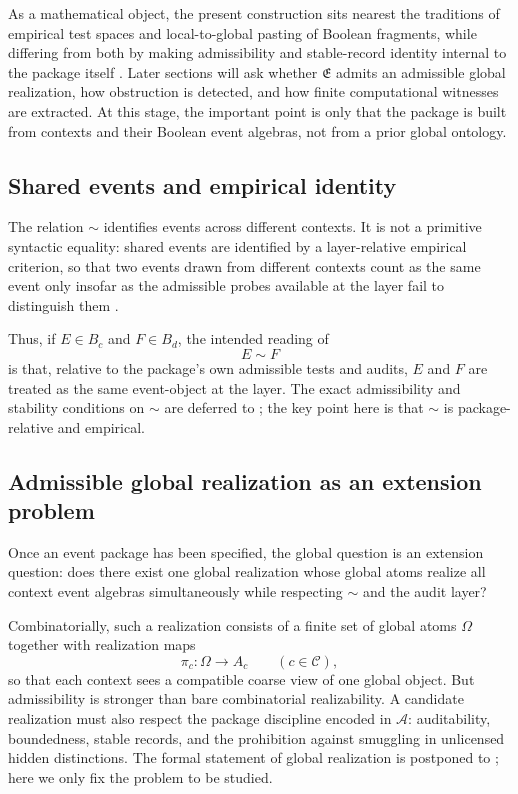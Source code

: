 \documentclass[11pt]{article}
\newcommand{\EventPackage}{\mathfrak{E}}
\theoremstyle{definition}
\begin{document}
As a mathematical object, the present construction sits nearest the traditions of empirical test spaces and local-to-global pasting of Boolean fragments, while differing from both by making admissibility and stable-record identity internal to the package itself \citep{FoulisRandall1972Operational,NavaraRogalewicz1991Pasting}. Later sections will ask whether \(\EventPackage\) admits an admissible global realization, how obstruction is detected, and how finite computational witnesses are extracted. At this stage, the important point is only that the package is built from contexts and their Boolean event algebras, not from a prior global ontology.

\subsection{Shared events and empirical identity}

The relation \(\sim\) identifies events across different contexts. It is not a primitive syntactic equality: shared events are identified by a layer-relative empirical criterion, so that two events drawn from different contexts count as the same event only insofar as the admissible probes available at the layer fail to distinguish them \citep{Tsiokos2026Quantum,Spekkens2005Contextuality,SchmidEtAl2021Noncontextuality}.

Thus, if \(E \in B_c\) and \(F \in B_d\), the intended reading of
\[
E \sim F
\]
is that, relative to the package's own admissible tests and audits, \(E\) and \(F\) are treated as the same event-object at the layer. The exact admissibility and stability conditions on \(\sim\) are deferred to ; the key point here is that \(\sim\) is package-relative and empirical.

\subsection{Admissible global realization as an extension problem}

Once an event package has been specified, the global question is an extension question: does there exist one global realization whose global atoms realize all context event algebras simultaneously while respecting \(\sim\) and the audit layer?

Combinatorially, such a realization consists of a finite set of global atoms \(\Omega\) together with realization maps
\[
\pi_c : \Omega \to A_c \qquad (c\in\mathcal C),
\]
so that each context sees a compatible coarse view of one global object. But admissibility is stronger than bare combinatorial realizability. A candidate realization must also respect the package discipline encoded in \(\mathcal A\): auditability, boundedness, stable records, and the prohibition against smuggling in unlicensed hidden distinctions. The formal statement of global realization is postponed to ; here we only fix the problem to be studied.
\end{document}
